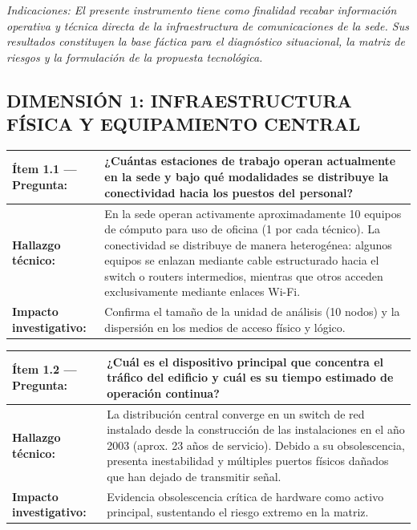 \documentclass[10pt,letterpaper]{article}
\begin{document}
\vspace{0.2cm}

{\small\itshape\color{black!80}Indicaciones: El presente instrumento tiene como finalidad recabar información operativa y técnica directa de la infraestructura de comunicaciones de la sede. Sus resultados constituyen la base fáctica para el diagnóstico situacional, la matriz de riesgos y la formulación de la propuesta tecnológica.}

\vspace{0.3cm}

\subsection*{\color{unabblue}\small DIMENSIÓN 1: INFRAESTRUCTURA FÍSICA Y EQUIPAMIENTO CENTRAL}

\begin{table}[h!]
  \centering
  \scriptsize
  \renewcommand{\arraystretch}{1.2}
  \begin{tabularx}{\textwidth}{@{}>{\bfseries\color{unabblue}}p{3.2cm} X@{}}
    \toprule
    Ítem 1.1 — Pregunta: & ¿Cuántas estaciones de trabajo operan actualmente en la sede y bajo qué modalidades se distribuye la conectividad hacia los puestos del personal? \\
    \midrule
    Hallazgo técnico: & En la sede operan activamente aproximadamente 10 equipos de cómputo para uso de oficina (1 por cada técnico). La conectividad se distribuye de manera heterogénea: algunos equipos se enlazan mediante cable estructurado hacia el switch o routers intermedios, mientras que otros acceden exclusivamente mediante enlaces Wi-Fi. \\
    Impacto investigativo: & Confirma el tamaño de la unidad de análisis (10 nodos) y la dispersión en los medios de acceso físico y lógico. \\
    \bottomrule
  \end{tabularx}
\end{table}

\begin{table}[h!]
  \centering
  \scriptsize
  \renewcommand{\arraystretch}{1.2}
  \begin{tabularx}{\textwidth}{@{}>{\bfseries\color{unabblue}}p{3.2cm} X@{}}
    \toprule
    Ítem 1.2 — Pregunta: & ¿Cuál es el dispositivo principal que concentra el tráfico del edificio y cuál es su tiempo estimado de operación continua? \\
    \midrule
    Hallazgo técnico: & La distribución central converge en un switch de red instalado desde la construcción de las instalaciones en el año 2003 (aprox. 23 años de servicio). Debido a su obsolescencia, presenta inestabilidad y múltiples puertos físicos dañados que han dejado de transmitir señal. \\
    Impacto investigativo: & Evidencia obsolescencia crítica de hardware como activo principal, sustentando el riesgo extremo en la matriz. \\
    \bottomrule
  \end{tabularx}
\end{table}
\end{document}
